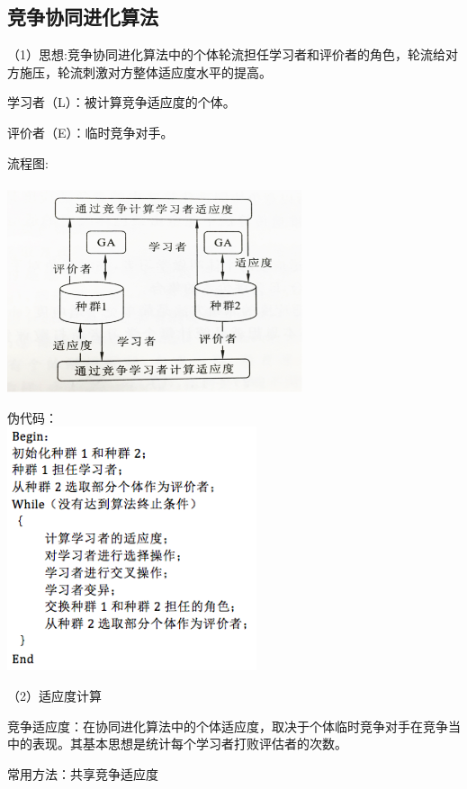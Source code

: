 \documentclass[8pt]{article}
\begin{document}
\subsection{竞争协同进化算法}
\begin{description}
      \item（1）思想:竞争协同进化算法中的个体轮流担任学习者和评价者的角色，轮流给对方施压，轮流刺激对方整体适应度水平的提高。\\
      \item 学习者（L）：被计算竞争适应度的个体。
      \item 评价者（E）：临时竞争对手。\\
      \item 流程图:\\\\
      \includegraphics[width=0.65\textwidth]{9.png}
     \item 伪代码：\\
     \includegraphics[width=0.55\textwidth]{10.png}     
      \item（2）适应度计算
      \item 竞争适应度：在协同进化算法中的个体适应度，取决于个体临时竞争对手在竞争当中的表现。其基本思想是统计每个学习者打败评估者的次数。
      \item 常用方法：共享竞争适应度\\

\end{description}
\end{document}
